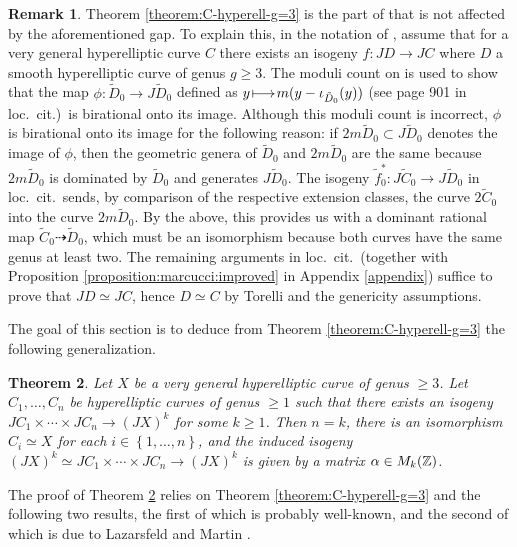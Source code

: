 \documentclass[a4paper,11pt,reqno]{amsart}
\makeatletter
\numberwithin{equation}{section}
\newtheorem{theorem}{Theorem}[section]
\theoremstyle{plain}
\theoremstyle{definition}
\newtheorem{remark}[theorem]{Remark}
\newcommand{\Z}{\mathbb Z}
\let\rm\relax
\newcommand{\rm}[1]{{\mathrm{#1}}}
\renewcommand{\mapsto}{\xymatrix@1@=15pt{\ar@{|->}[r]&}}
\renewcommand{\cong}{\simeq}
\newcommand{\set}[1]{\left\{ #1 \right\}}
\makeatother
\begin{document}
\begin{remark} \label{remark:naranjo-pirola-advances}
Theorem \ref{theorem:C-hyperell-g=3} is the part of \cite[Theorem 1.1]{naranjopirola2018} that is not affected by the aforementioned gap. 
To explain this, in the notation of \cite[Theorem 1.1]{naranjopirola2018}, assume that for a very general hyperelliptic curve $C$ there exists an isogeny $f \colon JD \to JC$ where $D$ a smooth hyperelliptic curve of genus $g \geq 3$. 
The moduli count on \cite[p.\ 901]{naranjopirola2018} is used to show that the map $\phi \colon \tilde D_0 \to J \tilde D_0$ defined as $y \mapsto m(y - \iota_{\tilde D_0}(y))$ (see page 901 in loc.\ cit.)\ is birational onto its image. 
Although this moduli count is incorrect, $\phi$ is birational onto its image for the following reason: if $2m \tilde D_0 \subset J \tilde D_0$ denotes the image of $\phi$, then the geometric genera of $\tilde D_0$ and $2m \tilde D_0$ are the same because $2m \tilde D_0$ is dominated by $\tilde D_0$ and generates $J \tilde D_0$. 
The isogeny $\tilde f_0^\ast \colon J\tilde C_0\to J\tilde D_0$ in loc.\ cit.\ sends, by comparison of the respective extension classes, the curve $2 \tilde C_0$ into the curve $2m\tilde D_0$.
By the above, this provides us with a dominant rational map $\tilde C_0\dashrightarrow  \tilde D_0$, which must be an isomorphism because both curves have the same genus at least two. 
The remaining arguments in loc.\ cit.\ (together with Proposition \ref{proposition:marcucci:improved} in Appendix \ref{appendix}) suffice to prove that $JD \cong JC$, hence $D \cong C$ by Torelli and the genericity assumptions.   
\end{remark}


The goal of this section is to deduce from Theorem \ref{theorem:C-hyperell-g=3} the following generalization. 

\begin{theorem} \label{proposition:matrixalphai}
Let $X$ be a very general hyperelliptic curve of genus $\geq 3$. Let $C_1, \dotsc, C_n$ be hyperelliptic curves of genus $\geq 1$ such that there exists an isogeny 
$
JC_1 \times \cdots \times JC_n \to (JX)^k
$
for some $k \geq 1$. 
Then $n = k$, there is an isomorphism $C_i \cong X$ for each $i \in \set{1,\dotsc, n}$, and the induced isogeny 
$
(JX)^k \cong J  C_{1} \times \cdots \times J  C_{n} \to (J X)^k
$
is given by a matrix $\alpha \in \rm{M}_k(\Z)$. 
\end{theorem}

The proof of Theorem \ref{proposition:matrixalphai} relies on Theorem \ref{theorem:C-hyperell-g=3} and the following two results, the first of which is probably well-known, and the second of which is due to Lazarsfeld and Martin \cite{lazarsfeld2023measures}. 
\end{document}
